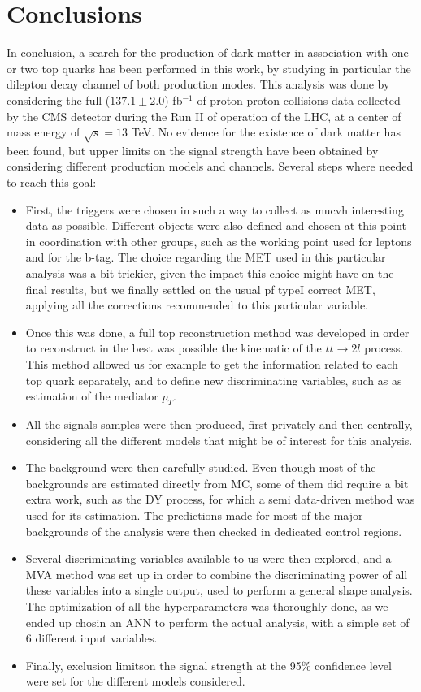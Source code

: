 \documentclass[a4paper, 10pt, openright]{report}
\begin{document}
\chapter{Conclusions} \label{chapter:Conclusion}

In conclusion, a search for the production of dark matter in association with one or two top quarks has been performed in this work, by studying in particular the dilepton decay channel of both production modes. This analysis was done by considering the full ($137.1 \pm 2.0$) fb$^{-1}$ of proton-proton collisions data collected by the \ac{CMS} detector during the Run II of operation of the \ac{LHC}, at a center of mass energy of $\sqrt{s} = 13$ TeV. No evidence for the existence of dark matter has been found, but upper limits on the signal strength have been obtained by considering different production models and channels.  Several steps where needed to reach this goal:

\begin{itemize}
\item First, the triggers were chosen in such a way to collect as mucvh interesting data as possible. Different objects were also defined and chosen at this point in coordination with other groups, such as the working point used for leptons and for the b-tag. The choice regarding the \ac{MET} used in this particular analysis was a bit trickier, given the impact this choice might have on the final results, but we finally settled on the usual pf typeI correct \ac{MET}, applying all the corrections recommended to this particular variable.
\item Once this was done, a full top reconstruction method was developed in order to reconstruct in the best was possible the kinematic of the $t \bar t \rightarrow 2l$ process. This method allowed us for example to get the information related to each top quark separately, and to define new discriminating variables, such as as estimation of the mediator \bm $p_T$.
\item All the signals samples were then produced, first privately and then centrally, considering all the different models that might be of interest for this analysis.
\item The background were then carefully studied. Even though most of the backgrounds are estimated directly from \ac{MC}, some of them did require a bit extra work, such as the \ac{DY} process, for which a semi data-driven method was used for its estimation. The predictions made for most of the major backgrounds of the analysis were then checked in dedicated control regions.
\item Several discriminating variables available to us were then explored, and a MVA method was set up in order to combine the discriminating power of all these variables into a single output, used to perform a general shape analysis. The optimization of all the hyperparameters was thoroughly done, as we ended up chosin an \ac{ANN} to perform the actual analysis, with a simple set of 6 different input variables.
\item Finally, exclusion limitson the signal strength at the 95\% confidence level were set for the different models considered.
\end{itemize}
\end{document}

